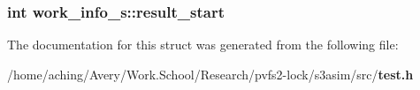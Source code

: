 \subsubsection{\setlength{\rightskip}{0pt plus 5cm}int \bf{work\_\-info\_\-s::result\_\-start}}\label{structwork__info__s_dfe6987552f04a777e20e5343ef9b6b7}




The documentation for this struct was generated from the following file:\begin{CompactItemize}
\item 
/home/aching/Avery/Work.School/Research/pvfs2-lock/s3asim/src/\bf{test.h}\end{CompactItemize}
